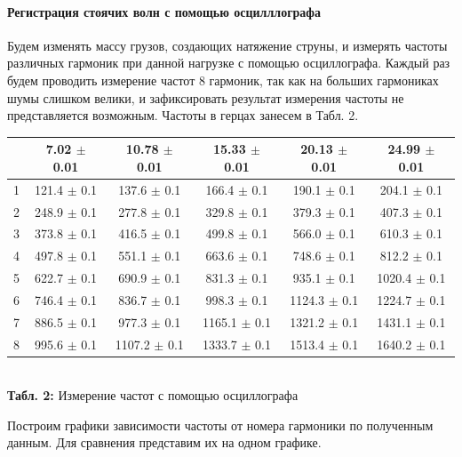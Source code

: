 \documentclass[12pt,a4paper]{scrartcl}
\begin{document}
	\paragraph{Регистрация стоячих волн с помощью осцилллографа} \hfill
	
	\par Будем изменять массу грузов, создающих натяжение струны, и измерять частоты различных гармоник при данной нагрузке с помощью осциллографа. Каждый раз будем проводить измерение частот 8 гармоник, так как на больших гармониках шумы слишком велики, и зафиксировать результат измерения частоты не представляется возможным. Частоты в герцах занесем в Табл. 2.
	
	\begin{center}
		\begin{tabular}{|c|c|c|c|c|c|}
			\hline
			\diagbox{№}{$T$, Н} & 7.02 $\pm$ 0.01 & 10.78 $\pm$ 0.01 & 15.33 $\pm$ 0.01 & 20.13 $\pm$ 0.01 & 24.99 $\pm$ 0.01
			\\\hline
			1 & 121.4 $\pm$ 0.1 & 137.6 $\pm$ 0.1 & 166.4 $\pm$ 0.1 & 190.1 $\pm$ 0.1 & 204.1 $\pm$ 0.1 
			\\\hline
			2 & 248.9 $\pm$ 0.1 & 277.8 $\pm$ 0.1 & 329.8 $\pm$ 0.1 & 379.3 $\pm$ 0.1 & 407.3 $\pm$ 0.1 
			\\\hline
			3 & 373.8 $\pm$ 0.1 & 416.5 $\pm$ 0.1 & 499.8 $\pm$ 0.1 & 566.0 $\pm$ 0.1 & 610.3 $\pm$ 0.1 
			\\\hline
			4 & 497.8 $\pm$ 0.1 & 551.1 $\pm$ 0.1 & 663.6 $\pm$ 0.1 & 748.6 $\pm$ 0.1 & 812.2 $\pm$ 0.1 
			\\\hline
			5 & 622.7 $\pm$ 0.1 & 690.9 $\pm$ 0.1 & 831.3 $\pm$ 0.1 & 935.1 $\pm$ 0.1 & 1020.4 $\pm$ 0.1 
			\\\hline
			6 & 746.4 $\pm$ 0.1 & 836.7 $\pm$ 0.1 & 998.3 $\pm$ 0.1 & 1124.3 $\pm$ 0.1 & 1224.7 $\pm$ 0.1 
			\\\hline
			7 & 886.5 $\pm$ 0.1 & 977.3 $\pm$ 0.1 & 1165.1 $\pm$ 0.1 & 1321.2 $\pm$ 0.1 & 1431.1 $\pm$ 0.1 
			\\\hline
			8 & 995.6 $\pm$ 0.1 & 1107.2 $\pm$ 0.1 & 1333.7 $\pm$ 0.1 & 1513.4 $\pm$ 0.1 & 1640.2 $\pm$ 0.1 
			\\\hline
		\end{tabular}
		\\\textbf{Табл. 2: } Измерение частот с помощью осциллографа
	\end{center}

	Построим графики зависимости частоты от номера гармоники по полученным данным. Для сравнения представим их на одном графике.
	
\end{document}
